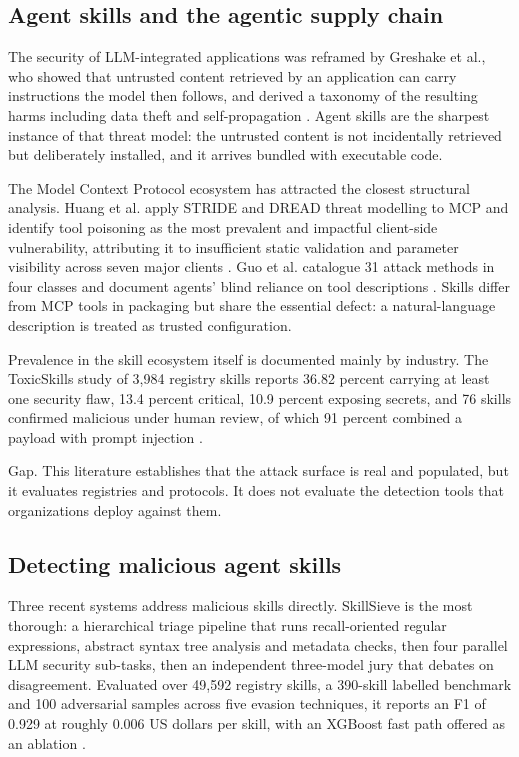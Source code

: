 \documentclass[conference]{IEEEtran}
\begin{document}
\subsection{Agent skills and the agentic supply chain}

The security of LLM-integrated applications was reframed by Greshake et al., who showed that untrusted content retrieved by an application can carry instructions the model then follows, and derived a taxonomy of the resulting harms including data theft and self-propagation \cite{ref2}. Agent skills are the sharpest instance of that threat model: the untrusted content is not incidentally retrieved but deliberately installed, and it arrives bundled with executable code.

The Model Context Protocol ecosystem has attracted the closest structural analysis. Huang et al. apply STRIDE and DREAD threat modelling to MCP and identify tool poisoning as the most prevalent and impactful client-side vulnerability, attributing it to insufficient static validation and parameter visibility across seven major clients \cite{ref3}. Guo et al. catalogue 31 attack methods in four classes and document agents' blind reliance on tool descriptions \cite{ref4}. Skills differ from MCP tools in packaging but share the essential defect: a natural-language description is treated as trusted configuration.

Prevalence in the skill ecosystem itself is documented mainly by industry. The ToxicSkills study of 3,984 registry skills reports 36.82 percent carrying at least one security flaw, 13.4 percent critical, 10.9 percent exposing secrets, and 76 skills confirmed malicious under human review, of which 91 percent combined a payload with prompt injection \cite{ref5}.

Gap. This literature establishes that the attack surface is real and populated, but it evaluates registries and protocols. It does not evaluate the detection tools that organizations deploy against them.

\subsection{Detecting malicious agent skills}

Three recent systems address malicious skills directly. SkillSieve is the most thorough: a hierarchical triage pipeline that runs recall-oriented regular expressions, abstract syntax tree analysis and metadata checks, then four parallel LLM security sub-tasks, then an independent three-model jury that debates on disagreement. Evaluated over 49,592 registry skills, a 390-skill labelled benchmark and 100 adversarial samples across five evasion techniques, it reports an F1 of 0.929 at roughly 0.006 US dollars per skill, with an XGBoost fast path offered as an ablation \cite{ref11}.
\end{document}
